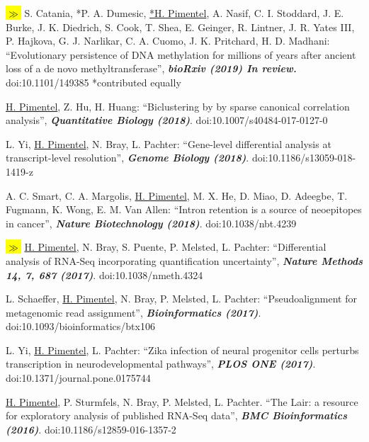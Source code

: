 \documentclass[11pt,notitlepage]{article} %
\newcommand{\hlc}[2][blue]{ {\sethlcolor{#1} \hl{#2}} }
\newcommand{\hlpub}{\hlc[Dandelion]{{\color{white}$\gg$} }}
\begin{document}
\begin{etaremune}

  \item\hlpub{} S. Catania, *P. A. Dumesic, \underline{*H. Pimentel}, A. Nasif, C. I. Stoddard, J. E. Burke, J. K. Diedrich, S. Cook, T. Shea, E. Geinger, R. Lintner, J. R. Yates III, P. Hajkova, G. J. Narlikar, C. A. Cuomo, J. K. Pritchard, H. D. Madhani: ``Evolutionary persistence of DNA methylation for millions of years after ancient loss of a de novo methyltransferase'', {\bf \emph{bioRxiv (2019) In review.}} doi:10.1101/149385 *contributed equally

  \item \underline{H. Pimentel}, Z. Hu, H. Huang: ``Biclustering by by sparse
canonical correlation analysis'', {\bf \emph{Quantitative Biology (2018)}}. doi:10.1007/s40484-017-0127-0

  \item L. Yi, \underline{H. Pimentel}, N. Bray, L. Pachter: ``Gene-level differential analysis at transcript-level resolution'', {\bf \emph{Genome Biology (2018)}}. doi:10.1186/s13059-018-1419-z

  \item A. C. Smart, C. A. Margolis, \underline{H. Pimentel}, M. X. He, D. Miao, D. Adeegbe, T. Fugmann, K. Wong, E. M. Van Allen: ``Intron retention is a source of neoepitopes in cancer'',  {\bf \emph{Nature Biotechnology (2018)}}. doi:10.1038/nbt.4239

  \item\hlpub{}\underline{H. Pimentel}, N. Bray, S. Puente, P. Melsted, L. Pachter:  ``Differential analysis of RNA-Seq incorporating quantification uncertainty'', {\bf \emph{Nature Methods 14, 7, 687 (2017)}}. doi:10.1038/nmeth.4324

  \item L. Schaeffer, \underline{H. Pimentel}, N. Bray, P. Melsted, L. Pachter: ``Pseudoalignment for metagenomic read assignment'', {\bf \emph{Bioinformatics (2017)}}. doi:10.1093/bioinformatics/btx106

  \item L. Yi, \underline{H. Pimentel}, L. Pachter: ``Zika infection of neural progenitor cells perturbs transcription in neurodevelopmental pathways'', {\bf \emph{PLOS ONE (2017)}}. doi:10.1371/journal.pone.0175744

  \item \underline{H. Pimentel}, P. Sturmfels, N. Bray, P. Melsted, L. Pachter. ``The Lair: a resource for exploratory analysis of published RNA-Seq data'', {\bf \emph{BMC Bioinformatics (2016)}}. doi:10.1186/s12859-016-1357-2


\end{etaremune}
\end{document}

